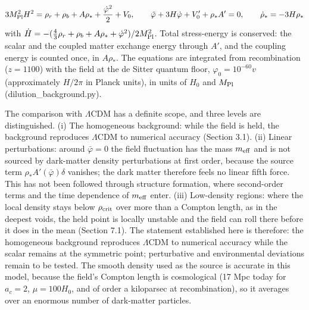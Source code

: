 \documentclass[pdflatex,sn-mathphys-num]{sn-jnl}
\begin{document}
\begin{equation}
3M_{\rm Pl}^2H^2=\rho_r+\rho_b+A\rho_*+\frac{\dot\varphi^2}{2}+V_0,\qquad \ddot\varphi+3H\dot\varphi+V_0'+\rho_*A'=0,\qquad \dot\rho_*=-3H\rho_*
\end{equation}
with $\dot H=-(\tfrac43\rho_r+\rho_b+A\rho_*+\dot\varphi^2)/2M_{\rm Pl}^2$. Total stress-energy is conserved: the scalar and the coupled matter exchange energy through $A'$, and the coupling energy is counted once, in $A\rho_*$. The equations are integrated from recombination ($z=1100$) with the field at the de Sitter quantum floor, $\varphi_0=10^{-60}v$ (approximately $H/2\pi$ in Planck units), in units of $H_0$ and $M_{\rm Pl}$ (dilution\_background.py).

The comparison with $\Lambda$CDM has a definite scope, and three levels are distinguished. (i) The homogeneous background: while the field is held, the background reproduces $\Lambda$CDM to numerical accuracy (Section 3.1). (ii) Linear perturbations: around $\bar\varphi=0$ the field fluctuation has the mass $m_{\rm eff}$ and is not sourced by dark-matter density perturbations at first order, because the source term $\rho_*A'(\bar\varphi)\delta$ vanishes; the dark matter therefore feels no linear fifth force. This has not been followed through structure formation, where second-order terms and the time dependence of $m_{\rm eff}$ enter. (iii) Low-density regions: where the local density stays below $\rho_{\rm crit}$ over more than a Compton length, as in the deepest voids, the held point is locally unstable and the field can roll there before it does in the mean (Section 7.1). The statement established here is therefore: the homogeneous background reproduces $\Lambda$CDM to numerical accuracy while the scalar remains at the symmetric point; perturbative and environmental deviations remain to be tested. The smooth density used as the source is accurate in this model, because the field's Compton length is cosmological (17 Mpc today for $a_c=2$, $\mu=100H_0$, and of order a kiloparsec at recombination), so it averages over an enormous number of dark-matter particles.
\end{document}
